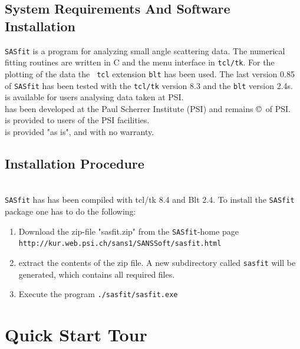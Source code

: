 \section{System Requirements And Software Installation}

{\tt SASfit} is a program for analyzing small angle scattering data.
The numerical fitting routines are written in C and the menu
interface in {\tt tcl/tk}. For the plotting of the data the {\tt
tcl} extension {\tt blt} has been used. The last version 0.85 of
{\tt SASfit} has been tested with the {\tt tcl/tk} version 8.3 and
the {\tt blt} version 2.4s. \\

\noindent
\SASfit is available for users analysing data taken at PSI. \\
\SASfit has been developed at the Paul Scherrer Institute (PSI) and remains \copyright\ of PSI. \\
\SASfit is provided to users of the PSI facilities.\\
\SASfit is provided "as is", and with no warranty. \\

\section{Installation Procedure} ~\\

\verb"SASfit" has has been compiled with tcl/tk 8.4 and Blt 2.4. To
install the \texttt{SASfit} package one has to do the following:
\begin{enumerate}
\item Download the zip-file "sasfit.zip" from the \texttt{SASfit}-home page\\
\verb"http://kur.web.psi.ch/sans1/SANSSoft/sasfit.html"
\item extract the contents of the zip file. A new subdirectory called \verb"sasfit" will be generated, which contains all required files.
\item Execute the program  \texttt{./sasfit/sasfit.exe}
\end{enumerate}

\chapter{Quick Start Tour}

